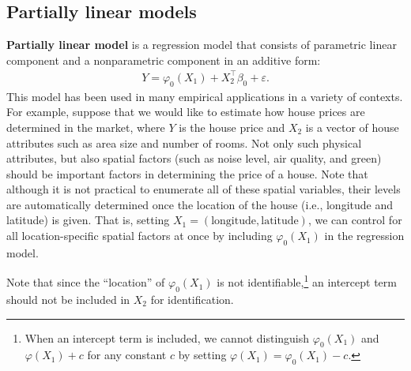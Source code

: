 \documentclass[10.5pt, A4paper, openany, uplatex]{book}
\newcommand{\eps}{\varepsilon}
\numberwithin{equation}{section}
\begin{document}
\subsection{Partially linear models}

\textbf{Partially linear model} is a regression model that consists of parametric linear component and a nonparametric component in an additive form:
\begin{align}\label{eq:plm}
	Y = \varphi_0(X_1) + X_2^\top\beta_0 + \eps.
\end{align}
This model has been used in many empirical applications in a variety of contexts.
For example, suppose that we would like to estimate how house prices are determined in the market, where $Y$ is the house price and $X_2$ is a vector of house attributes such as area size and number of rooms.
Not only such physical attributes, but also spatial factors (such as noise level, air quality, and green) should be important factors in determining the price of a house.
Note that although it is not practical to enumerate all of these spatial variables, their levels are automatically determined once the location of the house (i.e., longitude and latitude) is given.
That is, setting $X_1 = (\text{longitude}, \text{latitude})$, we can control for all location-specific spatial factors at once by including $\varphi_0(X_1)$ in the regression model.

Note that since the ``location'' of $\varphi_0(X_1)$ is not identifiable,\footnote{When an intercept term is included, we cannot distinguish $\varphi_0(X_1)$ and $\varphi(X_1) + c$ for any constant $c$ by setting $\varphi(X_1) = \varphi_0(X_1) - c$.} an intercept term should not be included in $X_2$ for identification.
\end{document}
